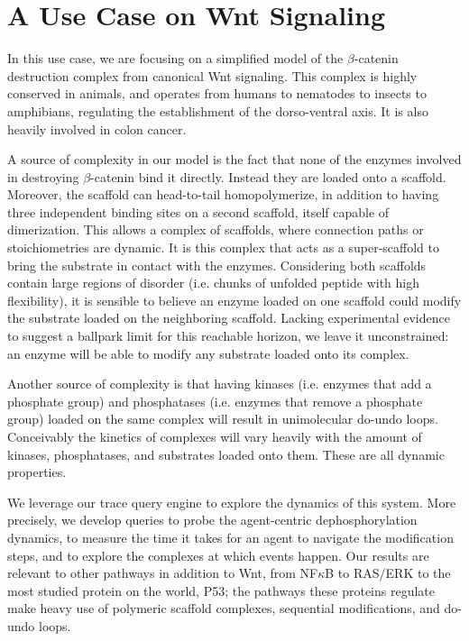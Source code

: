\section{A Use Case on Wnt Signaling}\label{sec:use-case}

In this use case, we are focusing on a simplified model of the
$\beta$-catenin destruction complex from canonical Wnt signaling. This
complex is highly conserved in animals, and operates from humans to
nematodes to insects to amphibians, regulating the establishment of
the dorso-ventral axis. It is also heavily involved in colon cancer.

A source of complexity in our model is the fact that none of the
enzymes involved in destroying $\beta$-catenin bind it directly.
Instead they are loaded onto a scaffold. Moreover, the scaffold can
head-to-tail homopolymerize, in addition to having three independent
binding sites on a second scaffold, itself capable of dimerization.
This allows a complex of scaffolds, where connection
paths or stoichiometries are dynamic. It is this complex that acts as a
super-scaffold to bring the substrate in contact with the
enzymes. Considering both scaffolds contain large regions of disorder
(i.e. chunks of unfolded peptide with high flexibility), it is
sensible to believe an enzyme loaded on one scaffold could modify the
substrate loaded on the neighboring scaffold. Lacking experimental
evidence to suggest a ballpark limit for this reachable horizon, we
leave it unconstrained: an enzyme will be able to modify any substrate
loaded onto its complex.

Another source of complexity is that having kinases (i.e. enzymes that add a phosphate group)
and phosphatases (i.e. enzymes that remove a phosphate group) loaded on
the same complex will result in unimolecular do-undo loops. Conceivably
the kinetics of complexes will vary heavily with the amount of kinases,
phosphatases, and substrates loaded onto them. These are all dynamic
properties.

We leverage our trace query engine to explore the dynamics of this
system. More precisely, we develop queries to probe the agent-centric
dephosphorylation dynamics, to measure the time it takes for an agent
to navigate the modification steps, and to explore the complexes at
which events happen. Our results are relevant to other pathways in
addition to Wnt, from NF$\kappa$B to RAS/ERK to the most studied
protein on the world, P53; the pathways these proteins regulate make heavy use of polymeric scaffold complexes, sequential modifications, and do-undo loops.


